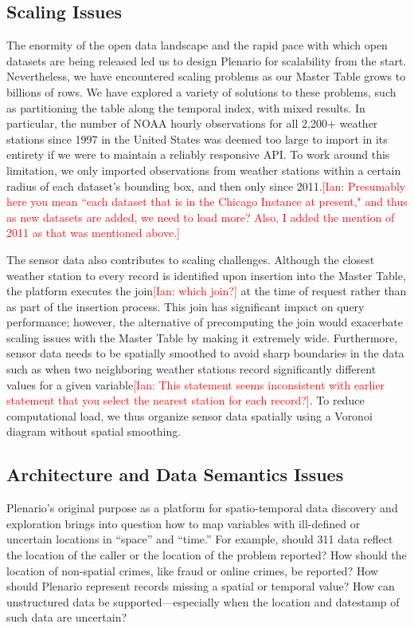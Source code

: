\documentclass[11pt]{article}
\newcommand{\ian}[1]{\textcolor{Red}{[Ian: #1]}}
\newcommand{\ian}[1]{}
\begin{document}
\subsection{\textbf{Scaling Issues}}
The enormity of the open data landscape and the rapid pace with which open datasets are being released led us to design Plenario for scalability from the start.
Nevertheless, we have encountered scaling problems as our Master Table grows to billions of rows. 
We have explored a variety of solutions to these problems, such as partitioning the table along the temporal index, with mixed results. In particular, the number of NOAA hourly observations for all 2,200+ weather stations since 1997 in the United States was deemed too large to import in its entirety if we were to maintain a reliably responsive API. To work around this limitation, we only imported observations from weather stations within a certain radius of each dataset's bounding box, and then only since 2011.\ian{Presumably here you mean ``each dataset that is in the Chicago Instance at present," and thus as new datasets are added, we need to load more? Also, I added the mention of 2011 as that was mentioned above.}

The sensor data also contributes to scaling challenges. Although the closest weather station to every record is identified upon insertion into the Master Table, the platform executes the join\ian{which join?} at the time of request rather than as part of the insertion process. This join has significant impact on query performance; however, the alternative of precomputing the join would exacerbate scaling issues with the Master Table by making it extremely wide. Furthermore, sensor data needs to be spatially smoothed to avoid sharp boundaries in the data such as when two neighboring weather stations record significantly different values for a given variable\ian{This statement seems inconsistent with earlier statement that you select the nearest station for each record?}. To reduce computational load, we thus organize sensor data spatially using a Voronoi diagram \cite{voronoi_1908} without spatial smoothing.

\subsection{\textbf{Architecture and Data Semantics Issues}}
Plenario's original purpose as a platform for spatio-temporal data discovery and exploration brings into question how to map variables with ill-defined or uncertain locations in ``space'' and ``time.'' For example, should 311 data reflect the location of the caller or the location of the problem reported? How should the location of non-spatial crimes, like fraud or online crimes, be reported? How should Plenario represent records missing a spatial or temporal value? How can unstructured data be supported---especially when the location and datestamp of such data are uncertain?
\end{document}
